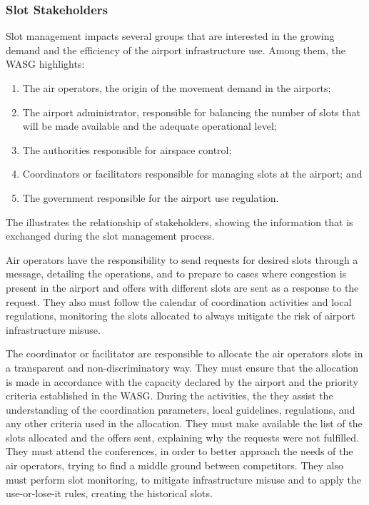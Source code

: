 \subsubsection{Slot Stakeholders}

Slot management impacts several groups that are interested in the growing demand and the efficiency of the airport infrastructure use. Among them, the \acrshort{WASG} highlights: 

\begin{enumerate}
	\item The air operators, the origin of the movement demand in the airports;
	\item The airport administrator, responsible for balancing the number of slots that will be made available and the adequate operational level;
	\item The authorities responsible for airspace control; 
	\item Coordinators or facilitators responsible for managing slots at the airport; and
        \item The government responsible for the airport use regulation.
\end{enumerate}%

The  illustrates the relationship of stakeholders, showing the information that is exchanged during the slot management process.

%

Air operators have the responsibility to send requests for desired slots through a message, detailing the operations, and to prepare to cases where congestion is present in the airport and offers with different slots are sent as a response to the request. They also must follow the calendar of coordination activities and local regulations, monitoring the slots allocated to always mitigate the risk of airport infrastructure misuse.

The coordinator or facilitator are responsible to allocate the air operators slots in a transparent and non-discriminatory way. They must ensure that the allocation is made in accordance with the capacity declared by the airport and the priority criteria established in the \acrshort{WASG}. During the activities, the they assist the understanding of the coordination parameters, local guidelines, regulations, and any other criteria used in the allocation. They must make available the list of the slots allocated and the offers sent, explaining why the requests were not fulfilled. They must attend the conferences, in order to better approach the needs of the air operators, trying to find a middle ground between competitors. They also must perform slot monitoring, to mitigate infrastructure misuse and to apply the use-or-lose-it rules, creating the historical slots.

